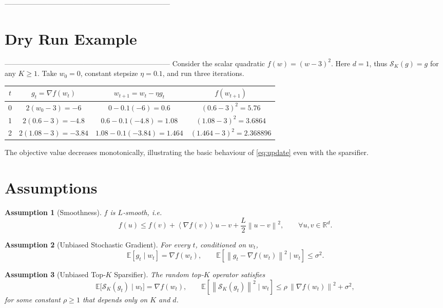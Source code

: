 \documentclass{article}
\newcommand{\EE}{\mathbb{E}}
\newcommand{\RR}{\mathbb{R}}
\newcommand{\norm}[1]{\left\|#1\right\|}
\newcommand{\inner}[1]{\left\langle #1 \right\rangle}
\newcommand{\topk}[1]{\mathcal{S}_K(#1)}
\newtheorem{assumption}{Assumption}
\begin{document}
---------------------------------------------------------------------
\section*{Dry Run Example}
---------------------------------------------------------------------
Consider the scalar quadratic $f(w)=(w-3)^2$.
Here $d=1$, thus $\topk{g}=g$ for any $K\ge1$.
Take $w_0=0$, constant stepsize $\eta=0.1$, and run three iterations.

\begin{center}
\begin{tabular}{c|c|c|c}
$t$ & $g_t=\nabla f(w_t)$ & $w_{t+1}=w_t-\eta g_t$ & $f(w_{t+1})$\\\hline
0 & $2(w_0-3) = -6$ & $0-0.1(-6)=0.6$ & $(0.6-3)^2=5.76$\\
1 & $2(0.6-3) = -4.8$ & $0.6-0.1(-4.8)=1.08$ & $(1.08-3)^2=3.6864$\\
2 & $2(1.08-3) = -3.84$ & $1.08-0.1(-3.84)=1.464$ & $(1.464-3)^2=2.368896$
\end{tabular}
\end{center}
The objective value decreases monotonically, illustrating the basic
behaviour of \eqref{eq:update} even with the sparsifier.

\section*{Assumptions}

\begin{assumption}[Smoothness]\label{ass:smooth}
$f$ is $L$‑smooth, i.e.
\[
f(u)\le f(v)+\inner{\nabla f(v)}{u-v}+ \frac{L}{2}\norm{u-v}^2,
\qquad\forall u,v\in\RR^{d}.
\]
\end{assumption}

\begin{assumption}[Unbiased Stochastic Gradient]\label{ass:unbiased}
For every $t$, conditioned on $w_t$,
\[
\EE[g_t\mid w_t]=\nabla f(w_t),\qquad 
\EE\!\left[\norm{g_t-\nabla f(w_t)}^2\mid w_t\right]\le\sigma^2 .
\]
\end{assumption}

\begin{assumption}[Unbiased Top‑$K$ Sparsifier]\label{ass:topk_unbiased}
The random top‑$K$ operator satisfies
\[
\EE\bigl[\topk{g_t}\mid w_t\bigr]=\nabla f(w_t),\qquad 
\EE\!\left[\norm{\topk{g_t}}^2\mid w_t\right]
\le \rho\,\norm{\nabla f(w_t)}^2+\sigma^2 ,
\]
for some constant $\rho\ge 1$ that depends only on $K$ and $d$.
\end{assumption}
\end{document}
